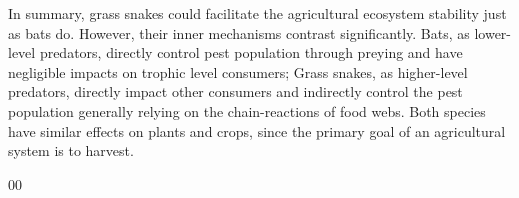 \documentclass[12pt]{article}
\begin{document}
In summary, grass snakes could facilitate the agricultural ecosystem stability just as bats do. However, their inner mechanisms contrast significantly. Bats, as lower-level predators, directly control pest population through preying  and have negligible impacts on trophic level consumers; Grass snakes, as higher-level predators, directly impact other consumers and indirectly control the pest population generally relying on the chain-reactions of food webs. Both species have similar effects on plants and crops, since the primary goal of an agricultural system is to harvest.

	\newpage
	\begin{thebibliography}{00}
		
		
		
		
		
		
	\end{thebibliography}
\end{document}

